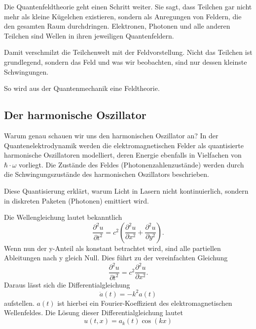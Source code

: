 	Die Quantenfeldtheorie geht einen Schritt weiter.
	Sie sagt, dass Teilchen gar nicht mehr als kleine Kügelchen existieren, sondern als Anregungen von Feldern, die den gesamten Raum durchdringen. 
	Elektronen, Photonen und alle anderen Teilchen sind Wellen in ihren jeweiligen Quantenfeldern.
	
	Damit verschmilzt die Teilchenwelt mit der Feldvorstellung.
	Nicht das Teilchen ist grundlegend, sondern das Feld und was wir beobachten, sind nur dessen kleinste Schwingungen.
	
	So wird aus der Quantenmechanik eine Feldtheorie.
	
\subsection{Der harmonische Oszillator\label{fourier:subsection:derHarmonischeOszillator}}
Warum genau schauen wir uns den harmonischen Oszillator an?
In der Quantenelektrodynamik werden die elektromagnetischen Felder als quantisierte harmonische Oszillatoren modelliert, deren Energie ebenfalls in Vielfachen von $\hbar\cdot\omega$ vorliegt.
Die Zustände des Feldes (Photonenzahlenzustände) werden durch die Schwingungszustände des harmonischen Oszillators beschrieben.

Diese Quantisierung erklärt, warum Licht in Lasern nicht kontinuierlich, sondern in diskreten Paketen (Photonen) emittiert wird. %

Die Wellengleichung lautet bekanntlich
\begin{equation}
    \frac{\partial^2 u}{\partial t^2} = c^2 \left( \frac{\partial^2 u}{\partial x^2} + \frac{\partial^2 u}{\partial y^2} \right).
\end{equation}
Wenn nun der y-Anteil als konstant betrachtet wird, sind alle partiellen Ableitungen nach y gleich Null.
Dies führt zu der vereinfachten Gleichung
\begin{equation}
    \frac{\partial^2 u}{\partial t^2} = c^2 \frac{\partial^2 u}{\partial x^2}.
\end{equation}
Daraus lässt sich die Differentialgleichung
\begin{equation}
    \ddot{a}(t) = -k^2 a(t)
\end{equation}
aufstellen.
$a(t)$ ist hierbei ein Fourier-Koeffizient des elektromagnetischen Wellenfeldes.
Die Lösung dieser Differentialgleichung lautet
\begin{equation}
    u(t,x) = a_k(t) \cos(kx)
\end{equation}

